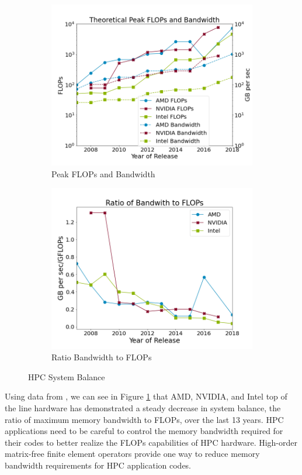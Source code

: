 \begin{figure}[h!]
\begin{subfigure}{.49\textwidth}
\includegraphics[width=.99\linewidth]{img/peakFlopsAndBandwidth}
\caption{Peak FLOPs and Bandwidth}
\end{subfigure}
\begin{subfigure}{.49\textwidth}
\includegraphics[width=.99\linewidth]{img/peakRatio}
\caption{Ratio Bandwidth to FLOPs}
\end{subfigure}
\caption{HPC System Balance}
\label{fig:peakratio}
\end{figure}

Using data from \cite{kruppcomparison}, we can see in Figure \ref{fig:peakratio} that AMD, NVIDIA, and Intel top of the line hardware has demonstrated a steady decrease in system balance, the ratio of maximum memory bandwidth to FLOPs, over the last 13 years.
HPC applications need to be careful to control the memory bandwidth required for their codes to better realize the FLOPs capabilities of HPC hardware.
High-order matrix-free finite element operators provide one way to reduce memory bandwidth requirements for HPC application codes.
